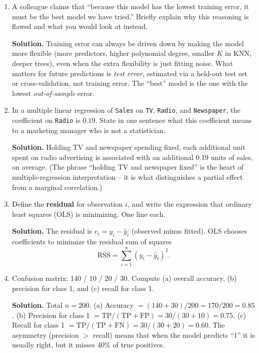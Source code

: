 \documentclass[11pt]{article}
\newcommand{\solution}[1]{%
  \par\medskip\noindent\textbf{Solution.} #1\par\medskip
}
\begin{document}
\begin{enumerate}[leftmargin=*]

\item A colleague claims that ``because this model has the lowest training error, it must be the best model we have tried.'' Briefly explain why this reasoning is flawed and what you would look at instead.

\solution{Training error can always be driven down by making the model more flexible (more predictors, higher polynomial degree, smaller $K$ in KNN, deeper trees), even when the extra flexibility is just fitting noise. What matters for future predictions is \emph{test error}, estimated via a held-out test set or cross-validation, not training error. The ``best'' model is the one with the lowest \emph{out-of-sample} error.}

\item In a multiple linear regression of \texttt{Sales} on \texttt{TV}, \texttt{Radio}, and \texttt{Newspaper}, the coefficient on \texttt{Radio} is $0.19$. State in one sentence what this coefficient means to a marketing manager who is not a statistician.

\solution{Holding TV and newspaper spending fixed, each additional unit spent on radio advertising is associated with an additional 0.19 units of sales, on average. (The phrase ``holding TV and newspaper fixed'' is the heart of multiple-regression interpretation -- it is what distinguishes a partial effect from a marginal correlation.)}

\item Define the \textbf{residual} for observation $i$, and write the expression that ordinary least squares (OLS) is minimizing. One line each.

\solution{The residual is $e_i = y_i - \hat y_i$ (observed minus fitted). OLS chooses coefficients to minimize the residual sum of squares
$$\text{RSS} = \sum_{i=1}^n (y_i - \hat y_i)^2.$$}

\item Confusion matrix: 140 / 10 / 20 / 30. Compute (a) overall accuracy, (b) precision for class 1, and (c) recall for class 1.

\solution{Total $n = 200$. \;
(a) Accuracy $= (140+30)/200 = 170/200 = \mathbf{0.85}$. \;
(b) Precision for class 1 $= \text{TP}/(\text{TP}+\text{FP}) = 30/(30+10) = \mathbf{0.75}$. \;
(c) Recall for class 1 $= \text{TP}/(\text{TP}+\text{FN}) = 30/(30+20) = \mathbf{0.60}$. \;
The asymmetry (precision $>$ recall) means that when the model predicts ``1'' it is usually right, but it misses 40\% of true positives.}


\end{enumerate}
\end{document}
